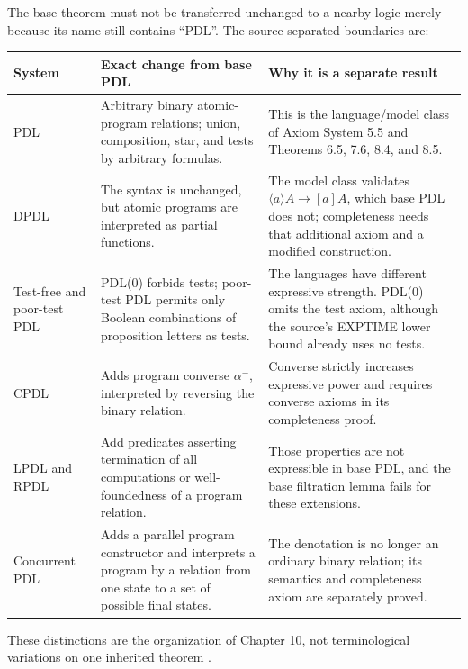 The base theorem must not be transferred unchanged to a nearby logic merely
because its name still contains \enquote{PDL}.  The source-separated boundaries
are:
\begin{center}
\begin{tabularx}{\textwidth}{@{}l X X@{}}
\toprule
System & Exact change from base PDL & Why it is a separate result \\
\midrule
PDL
  & Arbitrary binary atomic-program relations; union, composition, star, and
    tests by arbitrary formulas.
  & This is the language/model class of Axiom System 5.5 and Theorems 6.5,
    7.6, 8.4, and 8.5. \\
DPDL
  & The syntax is unchanged, but atomic programs are interpreted as partial
    functions.
  & The model class validates
    \(\langle a\rangle A\to[a]A\), which base PDL does not; completeness needs
    that additional axiom and a modified construction. \\
Test-free and poor-test PDL
  & PDL(0) forbids tests; poor-test PDL permits only Boolean combinations of
    proposition letters as tests.
  & The languages have different expressive strength.  PDL(0) omits the test
    axiom, although the source's EXPTIME lower bound already uses no tests. \\
CPDL
  & Adds program converse \(\alpha^{-}\), interpreted by reversing the binary
    relation.
  & Converse strictly increases expressive power and requires converse axioms
    in its completeness proof. \\
LPDL and RPDL
  & Add predicates asserting termination of all computations or
    well-foundedness of a program relation.
  & Those properties are not expressible in base PDL, and the base filtration
    lemma fails for these extensions. \\
Concurrent PDL
  & Adds a parallel program constructor and interprets a program by a relation
    from one state to a set of possible final states.
  & The denotation is no longer an ordinary binary relation; its semantics and
    completeness axiom are separately proved. \\
\bottomrule
\end{tabularx}
\end{center}
These distinctions are the organization of Chapter 10, not terminological
variations on one inherited theorem \cite[ch.~10]{HarelKozenTiuryn2000}.
